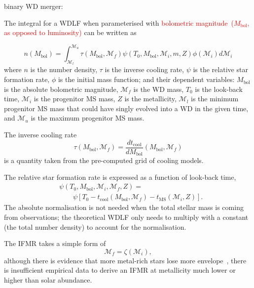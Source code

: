 \documentclass[fleqn,usenatbib]{rasti}
\begin{document}
binary WD merger: \citep{2020A&A...636A..31T}



The integral for a WDLF when parameterised with \textcolor{red}{bolometric magnitude~($M_\mathrm{bol}$, as opposed to luminosity)} can be written as

\begin{equation}
    n(M_{\mathrm{bol}}) = \int_{\mathcal{M}_l}^{\mathcal{M}_u}
        \tau(M_\mathrm{bol}, \mathcal{M}_f)
        \psi(T_0, M_\mathrm{bol}, \mathcal{M}_i, m, Z)
        \phi(\mathcal{M}_i) d\mathcal{M}_i
\end{equation}
where $n$ is the number density, $\tau$ is the inverse cooling rate, $\psi$ is
the relative star formation rate, $\phi$ is the initial mass function; and their
dependent variables: $M_\mathrm{bol}$ is the absolute bolometric
magnitude, $\mathcal{M}_f$ is the WD mass, $T_0$ is the look-back time, $\mathcal{M}_i$ is
the progenitor MS mass, $Z$ is the metallicity, $\mathcal{M}_l$ is the minimum
progenitor MS mass that could have singly evolved into a WD in the given time,
and $\mathcal{M}_u$ is the maximum progenitor MS mass.

The inverse cooling rate
\begin{equation}
    \tau(M_\mathrm{bol}, \mathcal{M}_f) = \dfrac{dt_{\mathrm{cool}}}{dM_\mathrm{bol}} \left( M_\mathrm{bol}, \mathcal{M}_f \right)
\end{equation}
is a quantity taken from the pre-computed grid of cooling models. 

The relative star formation rate is expressed as a function of look-back time,
\begin{align}
    &\psi(T_0, M_\mathrm{bol}, \mathcal{M}_i, \mathcal{M}_f, Z) =\\
    &\qquad\psi\left[T_0 - t_{\mathrm{cool}}\left(M_\mathrm{bol}, \mathcal{M}_f\right) - t_{\mathrm{MS}}\left(\mathcal{M}_i, Z\right)\right].
\end{align}
The absolute normalisation is not needed when the total stellar mass is coming
from observations; the theoretical WDLF only needs to multiply with a
constant (the total number density) to account for the normalisation.

The IFMR takes a simple form of
\begin{equation}
    \mathcal{M}_f = \zeta(\mathcal{M}_i),
\end{equation}
although there is evidence that more metal-rich stars lose more
envelope~\citep{2007ApJ...671..761K}, there is insufficient empirical data to
derive an IFMR at metallicity much lower or higher than solar abundance.
\end{document}
